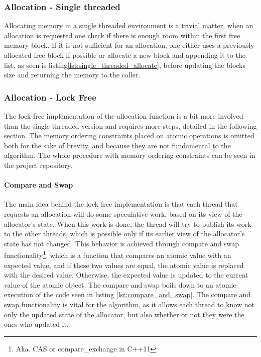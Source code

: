 \subsubsection{Allocation - Single threaded}
Allocating memory in a single threaded environment is a trivial matter, when an allocation is requested one check if there is enough room within the first free memory block.
If it is not sufficient for an allocation, one either uses a previously allocated free block if possible or allocate a new block and appending it to the list, as seen is listing\ref{lst:single_threaded_allocate}, before updating the blocks size and returning the memory to the caller.


\subsubsection{Allocation - Lock Free}
The lock-free implementation of the allocation function is a bit more involved than the single threaded version and requires more steps, detailed in the following section.
The memory ordering constraints placed on atomic operations is omitted both for the sake of brevity, and because they are not fundamental to the algorithm.
The whole procedure with memory ordering constraints can be seen in the project repository.

\paragraph{Compare and Swap}
The main idea behind the lock free implementation is that each thread that requests an allocation will do some speculative work, based on its view of the allocator's state.
When this work is done, the thread will try to publish its work to the other threads, which is possible only if its earlier view of the allocator's state has not changed.
This behavior is achieved through compare and swap functionality\footnote{Aka. CAS or compare\_exchange in C++11}, which is a function that compares an atomic value with an expected value, and if these two values are equal, the atomic value is replaced with the desired value.
Otherwise, the expected value is updated to the current value of the atomic object.
The compare and swap boils down to an atomic execution of the code seen in listing \ref{lst:compare_and_swap}.
The compare and swap functionality is vital for the algorithm, as it allows each thread to know not only the updated state of the allocator, but also whether or not they were the ones who updated it.


